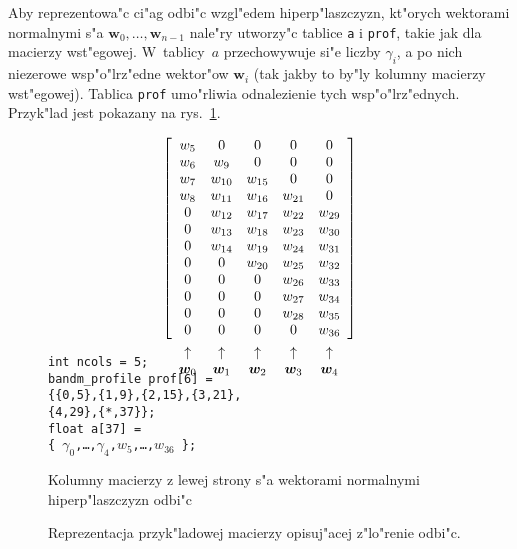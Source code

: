 Aby reprezentowa"c ci"ag odbi"c wzgl"edem hiperp"laszczyzn, kt"orych
wektorami normalnymi s"a $\bm{w}_0,\ldots,\bm{w}_{n-1}$ nale"ry utworzy"c
tablice \texttt{a} i \texttt{prof}, takie jak dla macierzy wst"egowej.
W~tablicy~$a$ przechowywuje si"e liczby $\gamma_i$, a po nich
niezerowe wsp"o"lrz"edne wektor"ow $\bm{w}_i$ (tak jakby to by"ly kolumny
macierzy wst"egowej). Tablica \texttt{prof} umo"rliwia odnalezienie tych
wsp"o"lrz"ednych. Przyk"lad jest pokazany na
rys.~\ref{fig:householder:matrix}.%
\begin{figure}[ht]
\newcommand{\mkb}[2]{\mbox{\raisebox{0pt}[0pt][0pt]{$\displaystyle%
\begin{array}[t]{@{}c@{}}{#1} \\[4pt] \uparrow \\ {#2} \end{array}$}}}
  \begin{minipage}{2.2in}
  \begin{align*}
    \left[\begin{array}{ccccc}
      w_5 &   0    &      0 &      0 &   0    \\
      w_6 & w_9    &      0 &      0 &   0    \\
      w_7 & w_{10} & w_{15} &      0 &   0    \\
      w_8 & w_{11} & w_{16} & w_{21} &   0    \\
        0 & w_{12} & w_{17} & w_{22} & w_{29} \\
        0 & w_{13} & w_{18} & w_{23} & w_{30} \\
        0 & w_{14} & w_{19} & w_{24} & w_{31} \\
        0 &   0    & w_{20} & w_{25} & w_{32} \\
        0 &   0    &      0 & w_{26} & w_{33} \\
        0 &   0    &      0 & w_{27} & w_{34} \\
        0 &   0    &      0 & w_{28} & w_{35} \\
        \mkb{0}{\bm{w}_0} & \mkb{0}{\bm{w}_1} &
        \mkb{0}{\bm{w}_2} & \mkb{0}{\bm{w}_3} &
        \mkb{w_{36}}{\bm{w}_4}
    \end{array}\right]
  \end{align*}
  \vspace*{0.6cm}
  \end{minipage}
  \begin{minipage}{2.75in}
    \texttt{int ncols = 5;} \\[10pt]
    \texttt{bandm\_profile prof[6] = \\
     \{\{0,5\},\{1,9\},\{2,15\},\{3,21\},\\
     \{4,29\},\{*,37\}\};} \\[10pt]
    \texttt{float a[37] = \\
    \{ $\gamma_0$,\ldots,$\gamma_4$,$w_5$,\ldots,$w_{36}$ \};}
  \end{minipage}
  \caption{\label{fig:householder:matrix}Reprezentacja przyk"ladowej
    macierzy opisuj"acej z"lo"renie odbi"c.}
  \centerline{Kolumny macierzy z lewej strony s"a wektorami normalnymi
    hiperp"laszczyzn odbi"c}
\end{figure}

